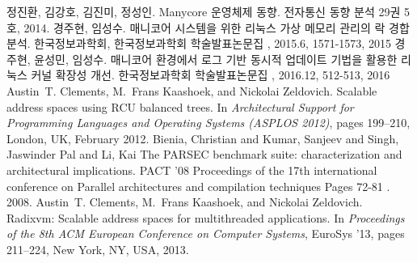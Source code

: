 \documentclass{kcc}
\begin{document}

\begin{thebibliography}{7}
정진환, 김강호, 김진미, 정성인. 
\newblock Manycore 운영체제 동향. 
\newblock 전자통신 동향 분석 29권 5호, 2014. 
경주현, 임성수.
\newblock 매니코어 시스템을 위한 리눅스 가상 메모리 관리의 락 경합 분석. 
\newblock 한국정보과학회, 한국정보과학회 학술발표논문집 , 2015.6, 1571-1573, 2015
경주현, 윤성민, 임성수.
\newblock 매니코어 환경에서 로그 기반 동시적 업데이트 기법을 활용한 리눅스 커널 확장성 개선.
\newblock 한국정보과학회 학술발표논문집 , 2016.12, 512-513, 2016
Austin~T. Clements, M.~Frans Kaashoek, and Nickolai Zeldovich.
\newblock Scalable address spaces using {RCU} balanced trees.
\newblock In {\em Architectural Support for Programming Languages and Operating
  Systems (ASPLOS 2012)}, pages 199--210, London, UK, February 2012.
Bienia, Christian and Kumar, Sanjeev and Singh, Jaswinder Pal and Li, Kai
\newblock The PARSEC benchmark suite: characterization and architectural
implications.
\newblock PACT '08 Proceedings of the 17th international
conference on Parallel architectures and compilation techniques Pages 72-81 . 2008.
Austin~T. Clements, M.~Frans Kaashoek, and Nickolai Zeldovich.
\newblock Radixvm: Scalable address spaces for multithreaded applications.
\newblock In {\em Proceedings of the 8th ACM European Conference on Computer
  Systems}, EuroSys '13, pages 211--224, New York, NY, USA, 2013.

\end{thebibliography}

%
%
\end{document}
